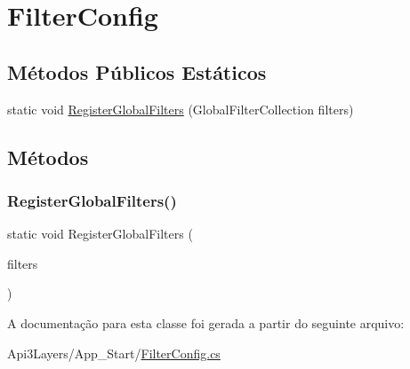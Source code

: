 \hypertarget{classApi3Layers_1_1FilterConfig}{}\section{Filter\+Config}
\label{classApi3Layers_1_1FilterConfig}
\subsection*{Métodos Públicos Estáticos}
\begin{DoxyCompactItemize}
\item 
static void \hyperlink{classApi3Layers_1_1FilterConfig_a25694cee76ca514824bd682cfc9b4ad0}{Register\+Global\+Filters} (Global\+Filter\+Collection filters)
\end{DoxyCompactItemize}


\subsection{Métodos}
\mbox{\label{classApi3Layers_1_1FilterConfig_a25694cee76ca514824bd682cfc9b4ad0}} 
\subsubsection{\texorpdfstring{Register\+Global\+Filters()}{RegisterGlobalFilters()}}
{\footnotesize\ttfamily static void Register\+Global\+Filters (\begin{DoxyParamCaption}\item[{Global\+Filter\+Collection}]{filters }\end{DoxyParamCaption})\hspace{0.3cm}{\ttfamily [static]}}



A documentação para esta classe foi gerada a partir do seguinte arquivo\+:\begin{DoxyCompactItemize}
\item 
Api3\+Layers/\+App\+\_\+\+Start/\hyperlink{FilterConfig_8cs}{Filter\+Config.\+cs}\end{DoxyCompactItemize}
